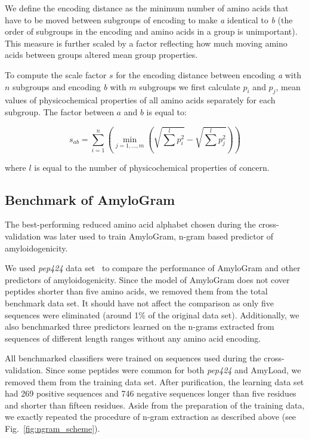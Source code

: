 \documentclass{bioinfo}
\begin{document}
\begin{methods}
  We define the encoding distance as the minimum number of amino acids that 
have to be moved between subgroups of encoding to make \textit{a} identical to 
\textit{b} (the order of subgroups in the encoding and amino acids in a group 
is unimportant). This measure is further scaled by a factor reflecting how 
much moving amino acids between groups altered mean group properties. 

To compute the scale factor $s$ for the encoding distance between 
encoding \textit{a} with $n$ subgroups and encoding \textit{b} with $m$ 
subgroups we first calculate $p_i$ and $p_j$, mean values of physicochemical 
properties of all amino acids separately for each subgroup. The factor between 
%
%
%
$a$ and $b$ is equal to: 

$$
s_{ab} = \sum^n_{i = 1}  \left( \min_{j=1,\dots,m} \left(\sqrt{\sum^l p_{i}^2} 
- \sqrt{\sum^l p_{j}^2} \right) \right)
$$
 
where $l$ is equal to the number of physicochemical properties of concern.

\subsection{Benchmark of AmyloGram}

The best-performing reduced amino acid alphabet chosen during the 
cross-validation was later used to train AmyloGram, n-gram based predictor of 
amyloidogenicity.

  We used \textit{pep424} data set~\citep{walsh_pasta_2014} to compare the 
performance of AmyloGram and other predictors of amyloidogenicity. Since the 
model of AmyloGram does not cover peptides shorter than five amino acids, we 
removed them from the total benchmark data set. It should have not affect the 
comparison as only five sequences were eliminated (around 1\% of the original 
data set). Additionally, we also benchmarked three predictors learned on the 
n-grams extracted from sequences of different length ranges without any amino 
acid encoding.

  All benchmarked classifiers were trained on sequences used during the 
cross-validation. Since some peptides were common for both \textit{pep424} and 
AmyLoad, we removed them from the training data set. After purification, the 
learning data set had 269 positive sequences and 746 negative sequences longer 
than five residues and shorter than fifteen residues. Aside from the 
preparation of the training data, we exactly repeated the procedure of n-gram 
extraction as described above (see Fig.~\ref{fig:ngram_scheme}). 


\end{methods}
\end{document}
